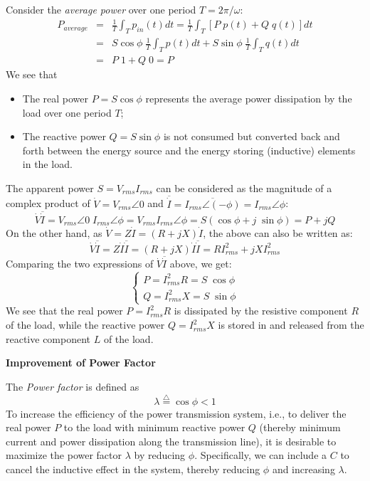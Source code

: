 Consider the {\em average power} over one period $T=2\pi/\omega$:
\begin{eqnarray}
  P_{average}&=&\frac{1}{T}\int_T p_{in}(t)dt
  =\frac{1}{T}\int_T  \left[P\; p(t) + Q\; q(t) \right] dt
  \nonumber \\
  &=&S\cos\phi\;\frac{1}{T}\int_T p(t)dt+S\sin\phi\;\frac{1}{T}\int_T q(t)dt
  \nonumber \\
  &=&P\;1+Q\;0=P 
  \nonumber
\end{eqnarray}
We see that
\begin{itemize}
\item The real power $P=S\cos\phi$ represents the average power dissipation 
  by the load over one period $T$;
\item The reactive power $Q=S\sin\phi$ is not consumed but converted back 
  and forth between the energy source and the energy storing (inductive)
  elements in the load.
\end{itemize}
The apparent power $S=V_{rms}I_{rms}$ can be considered as the magnitude of 
a complex product of $\dot{V}=V_{rms}\angle 0$ and 
$\overline{\dot{I}}=\overline{I_{rms}\angle(-\phi)}=I_{rms}\angle\phi$:
\[
\dot{V}\overline{\dot{I}}=V_{rms}\angle 0\; I_{rms}\angle \phi=V_{rms}I_{rms}\angle \phi
=S(\cos\phi+j\;\sin\phi)=P+jQ	
\]
On the other hand, as $\dot{V}=Z\dot{I}=(R+jX)\dot{I}$, the above can 
also be written as:
\[
\dot{V}\overline{\dot{I}}=Z\dot{I}\overline{\dot{I}}
=(R+jX)\dot{I}\overline{\dot{I}}=RI^2_{rms}+jX I^2_{rms}	
\]
Comparing the two expressions of $\dot{V}\overline{\dot{I}}$ above, we get:
\[ 
\left\{ \begin{array}{l}P=I^2_{rms}R=S\;\cos\phi \\
Q=I^2_{rms}X=S\;\sin\phi \end{array} \right. 
\]
We see that the real power $P=I^2_{rms}R$ is dissipated by the resistive
component $R$ of the load, while the reactive power $Q=I^2_{rms}X$ is stored 
in and released from the reactive component $L$ of the load. 



{\bf Improvement of Power Factor}

The {\em Power factor} is defined as
\[
\lambda\stackrel{\triangle}{=}\cos \phi < 1
\]
To increase the efficiency of the power transmission system, i.e., to 
deliver the real power $P$ to the load with minimum reactive power $Q$ 
(thereby minimum current and power dissipation along the transmission 
line), it is desirable to maximize the power factor $\lambda$ by reducing 
$\phi$. Specifically, we can include a 
$C$ to cancel the inductive effect in the system, thereby reducing $\phi$ 
and increasing $\lambda$. 

